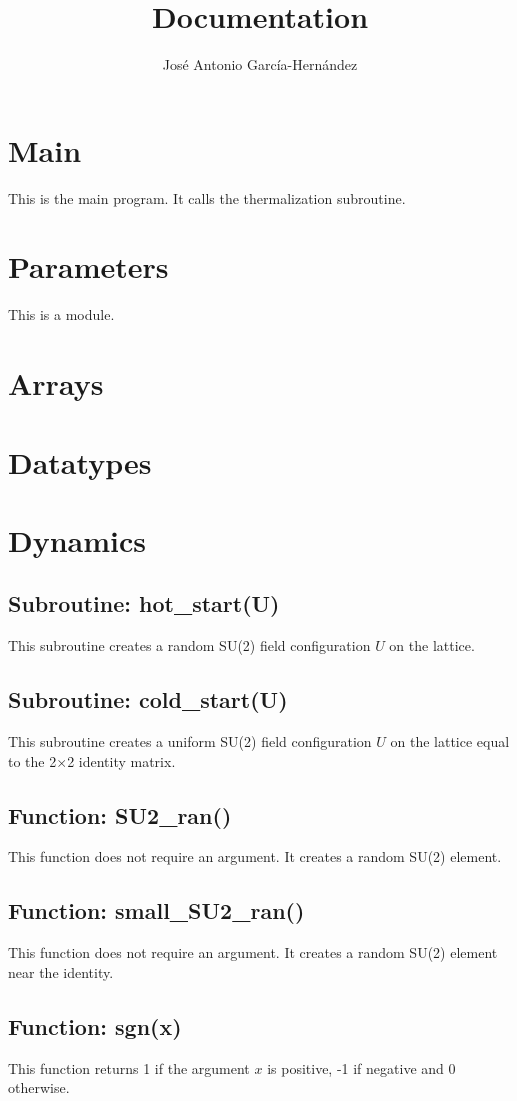 \documentclass[12pt,a4paper]{article}
\author{José Antonio García-Hernández}
\title{Documentation}
\begin{document}
\maketitle

\section{Main}
This is the main program. It calls the thermalization subroutine.
\section{Parameters}
This is a module.
\section{Arrays}
\section{Datatypes} 
\section{Dynamics}
\subsection{Subroutine: hot\_start(U)}
 This subroutine creates a random SU(2) field configuration $U$ on the lattice.
 \subsection{Subroutine: cold\_start(U)}
 This subroutine creates a uniform SU(2) field configuration $U$ on the lattice equal to the 2$\times$2 identity matrix.
 \subsection{Function: SU2\_ran()}
 This function does not require an argument. It creates a random SU(2) element.
 \subsection{Function: small\_SU2\_ran()}
 This function does not require an argument. It creates a random SU(2) element near the identity. 
  \subsection{Function: sgn(x)}
 This function returns 1 if the argument $x$ is positive, -1 if negative and 0 otherwise. 
\end{document}
